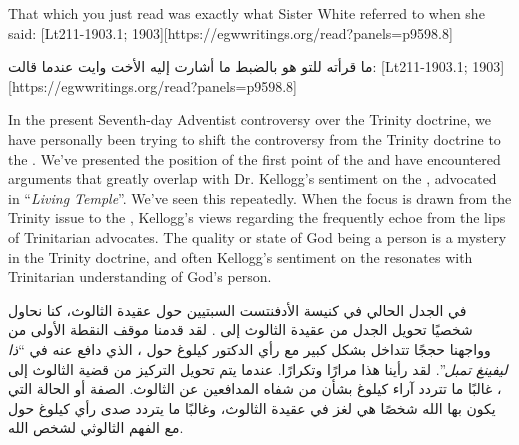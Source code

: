 That which you just read was exactly what Sister White referred to when she said: [Lt211-1903.1; 1903][https://egwwritings.org/read?panels=p9598.8]


ما قرأته للتو هو بالضبط ما أشارت إليه الأخت وايت عندما قالت: [Lt211-1903.1; 1903][https://egwwritings.org/read?panels=p9598.8]


In the present Seventh-day Adventist controversy over the Trinity doctrine, we have personally been trying to shift the controversy from the Trinity doctrine to the . We’ve presented the position of the first point of the  and have encountered arguments that greatly overlap with Dr. Kellogg’s sentiment on the , advocated in “\textit{Living Temple}”. We’ve seen this repeatedly. When the focus is drawn from the Trinity issue to the , Kellogg’s views regarding the  frequently echoe from the lips of Trinitarian advocates. The quality or state of God being a person is a mystery in the Trinity doctrine, and often Kellogg’s sentiment on the  resonates with Trinitarian understanding of God’s person.


في الجدل الحالي في كنيسة الأدفنتست السبتيين حول عقيدة الثالوث، كنا نحاول شخصيًا تحويل الجدل من عقيدة الثالوث إلى . لقد قدمنا موقف النقطة الأولى من  وواجهنا حججًا تتداخل بشكل كبير مع رأي الدكتور كيلوغ حول ، الذي دافع عنه في “\textit{ذا ليفينغ تمبل}”. لقد رأينا هذا مرارًا وتكرارًا. عندما يتم تحويل التركيز من قضية الثالوث إلى ، غالبًا ما تتردد آراء كيلوغ بشأن  من شفاه المدافعين عن الثالوث. الصفة أو الحالة التي يكون بها الله شخصًا هي لغز في عقيدة الثالوث، وغالبًا ما يتردد صدى رأي كيلوغ حول  مع الفهم الثالوثي لشخص الله.


